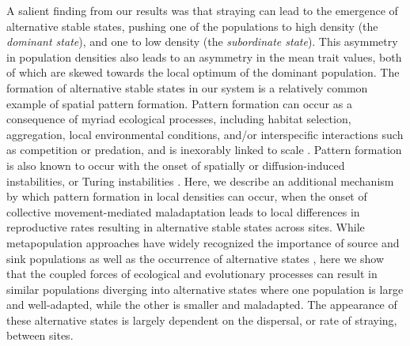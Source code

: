 \documentclass{revtex4}
\begin{document}
A salient finding from our results was that straying can lead to the emergence of alternative stable states, pushing one of the populations to high density (the \emph{dominant state}), and one to low density (the \emph{subordinate state}).
This asymmetry in population densities also leads to an asymmetry in the mean trait values, both of which are skewed towards the local optimum of the dominant population. 
The formation of alternative stable states in our system is a relatively common example of spatial pattern formation. %
Pattern formation can occur as a consequence of myriad ecological processes, including habitat selection, aggregation, local environmental conditions, and/or interspecific interactions such as competition or predation, and is inexorably linked to scale \citep{Levin:1992p1472}. 
Pattern formation is also known to occur with the onset of spatially or diffusion-induced instabilities, or Turing instabilities \citep{Meinhardt:2012hw}. 
Here, we describe an additional mechanism by which pattern formation in local densities can occur, when the onset of collective movement-mediated maladaptation leads to local differences in reproductive rates resulting in alternative stable states across sites. 
While metapopulation approaches have widely recognized the importance of source and sink populations \citep{Hanski:1999vu} as well as the occurrence of alternative states \citep{Boughton:1999fa}, here we show that the coupled forces of ecological and evolutionary processes can result in similar populations diverging into alternative states where one population is large and well-adapted, while the other is smaller and maladapted.
The appearance of these alternative states is largely dependent on the dispersal, or rate of straying, between sites.

% 
\end{document}
